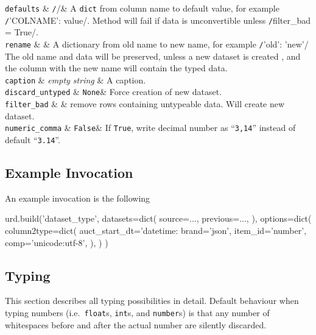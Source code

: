   \RP \texttt{defaults} & \texttt/{}/& A \texttt{dict} from
  column name to default value, for example
  \texttt/{'COLNAME': value}/.  Method will fail if data
  is unconvertible unless \texttt/filter_bad = True/.\\[1ex]

  \RP \texttt{rename} & & A dictionary from old name to new name, for
  example \texttt/{'old': 'new'}/ The old name and data
  will be preserved, unless a new dataset is created ,
  and the column with the new name will contain the typed
  data. \\[1ex]

  \RP \texttt{caption} & \textsl{empty string} & A caption.\\[4ex]

  \RP \texttt{discard\_untyped} & \texttt{None}& Force creation of new dataset.\\[1ex]

  \RP \texttt{filter\_bad} & \pyFalse &  remove rows containing untypeable data.  Will create new dataset.\\[1ex]

  \RP \texttt{numeric\_comma} & \texttt{False}& If
  \texttt{True}, write decimal number as ``\texttt{3,14}'' instead of
  default ``\texttt{3.14}''.\\[1ex]
\stoptable
  




\subsection{Example Invocation}
An example invocation is the following

\begin{python}
urd.build('dataset_type',
    datasets=dict(
        source=...,
        previous=...,
    ),
    options=dict(
        column2type=dict(
            auct_start_dt='datetime:%
            brand='json',
            item_id='number',
            comp='unicode:utf-8',
        ),
    )
)
\end{python}



\subsection{Typing}
This section describes all typing possibilities in detail.  Default
behaviour when typing numbers (i.e.\ \texttt{float}s, \texttt{int}s,
and \texttt{number}s) is that any number of whitespaces before and
after the actual number are silently discarded.



